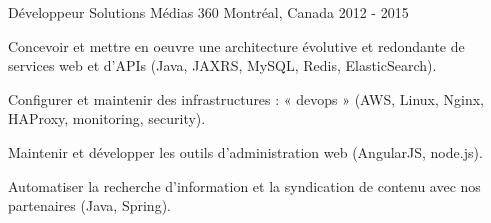 \begin{cventries}
  \cventry
    {Développeur} %
    {Solutions Médias 360} %
    {Montréal, Canada} %
    {2012 - 2015} %
    {
      \begin{cvitems} %
        \item {Concevoir et mettre en oeuvre une architecture évolutive et redondante de services web et d’APIs (Java, JAXRS, MySQL, Redis, ElasticSearch).}
        \item {Configurer et maintenir des infrastructures : « devops » (AWS, Linux, Nginx, HAProxy, monitoring, security).}
        \item {Maintenir et développer les outils d’administration web (AngularJS, node.js).}
        \item {Automatiser la recherche d'information et la syndication de contenu avec nos partenaires (Java, Spring).}
      \end{cvitems}
    }




\end{cventries}
